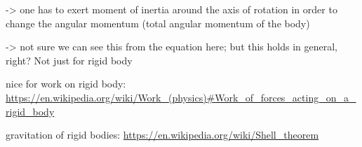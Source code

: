 \documentclass[../class_mech_main.tex]{subfiles}
\begin{document}
-> one has to exert moment of inertia around the axis of rotation in order to change the angular momentum (total angular momentum of the body)

-> not sure we can see this from the equation here; but this holds in general, right? Not just for rigid body




nice for work on rigid body: \url{https://en.wikipedia.org/wiki/Work_(physics)#Work_of_forces_acting_on_a_rigid_body}



gravitation of rigid bodies: \url{https://en.wikipedia.org/wiki/Shell_theorem}
\end{document}
